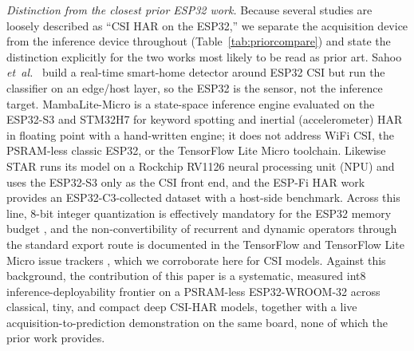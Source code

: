 \documentclass{ieeeaccess}
\begin{document}
\emph{Distinction from the closest prior ESP32 work.} Because several studies are loosely described as ``CSI HAR on the ESP32,'' we separate the acquisition device from the inference device throughout (Table~\ref{tab:priorcompare}) and state the distinction explicitly for the two works most likely to be read as prior art. Sahoo \emph{et~al.}~\cite{sahoo2023realtime} build a real-time smart-home detector around ESP32 CSI but run the classifier on an edge/host layer, so the ESP32 is the sensor, not the inference target. MambaLite-Micro \cite{mambalite2025} is a state-space inference engine evaluated on the ESP32-S3 and STM32H7 for keyword spotting and inertial (accelerometer) HAR in floating point with a hand-written engine; it does not address WiFi CSI, the PSRAM-less classic ESP32, or the TensorFlow Lite Micro toolchain. Likewise STAR \cite{star2025} runs its model on a Rockchip RV1126 neural processing unit (NPU) and uses the ESP32-S3 only as the CSI front end, and the ESP-Fi HAR work \cite{espfihar2026} provides an ESP32-C3-collected dataset with a host-side benchmark. Across this line, 8-bit integer quantization is effectively mandatory for the ESP32 memory budget \cite{greensensing2026}, and the non-convertibility of recurrent and dynamic operators through the standard export route is documented in the TensorFlow and TensorFlow Lite Micro issue trackers \cite{tfissue36688,tflmissue907}, which we corroborate here for CSI models. Against this background, the contribution of this paper is a systematic, measured int8 inference-deployability frontier on a PSRAM-less ESP32-WROOM-32 across classical, tiny, and compact deep CSI-HAR models, together with a live acquisition-to-prediction demonstration on the same board, none of which the prior work provides.
\end{document}
